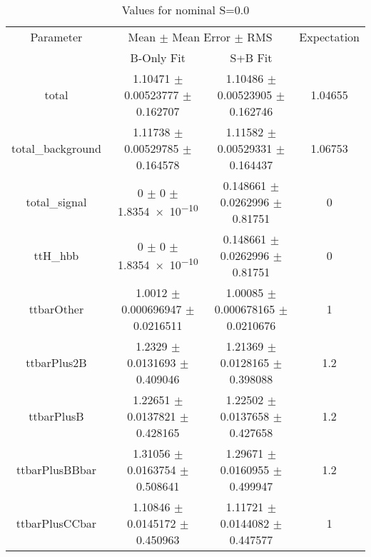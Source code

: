 \begin{table}
\centering
\caption{Values for nominal S=0.0}
\begin{tabular}{cccc}
\toprule
Parameter & \multicolumn{2}{c}{Mean $\pm$ Mean Error $\pm$ RMS} & Expectation\\
 & B-Only Fit & S+B Fit & \\
\midrule
total & \num{1.10471} $\pm$ \num{0.00523777} $\pm$ \num{0.162707} & \num{1.10486} $\pm$ \num{0.00523905} $\pm$ \num{0.162746} & \num{1.04655}\\
total\_background & \num{1.11738} $\pm$ \num{0.00529785} $\pm$ \num{0.164578} & \num{1.11582} $\pm$ \num{0.00529331} $\pm$ \num{0.164437} & \num{1.06753}\\
total\_signal & \num{0} $\pm$ \num{0} $\pm$ \num{1.8354e-10} & \num{0.148661} $\pm$ \num{0.0262996} $\pm$ \num{0.81751} & \num{0}\\
ttH\_hbb & \num{0} $\pm$ \num{0} $\pm$ \num{1.8354e-10} & \num{0.148661} $\pm$ \num{0.0262996} $\pm$ \num{0.81751} & \num{0}\\
ttbarOther & \num{1.0012} $\pm$ \num{0.000696947} $\pm$ \num{0.0216511} & \num{1.00085} $\pm$ \num{0.000678165} $\pm$ \num{0.0210676} & \num{1}\\
ttbarPlus2B & \num{1.2329} $\pm$ \num{0.0131693} $\pm$ \num{0.409046} & \num{1.21369} $\pm$ \num{0.0128165} $\pm$ \num{0.398088} & \num{1.2}\\
ttbarPlusB & \num{1.22651} $\pm$ \num{0.0137821} $\pm$ \num{0.428165} & \num{1.22502} $\pm$ \num{0.0137658} $\pm$ \num{0.427658} & \num{1.2}\\
ttbarPlusBBbar & \num{1.31056} $\pm$ \num{0.0163754} $\pm$ \num{0.508641} & \num{1.29671} $\pm$ \num{0.0160955} $\pm$ \num{0.499947} & \num{1.2}\\
ttbarPlusCCbar & \num{1.10846} $\pm$ \num{0.0145172} $\pm$ \num{0.450963} & \num{1.11721} $\pm$ \num{0.0144082} $\pm$ \num{0.447577} & \num{1}\\
\bottomrule
\end{tabular}
\end{table}